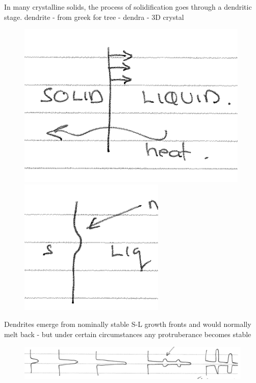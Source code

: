 \documentclass[class=report, crop=false, 12pt,a4paper]{standalone}
\begin{document}
In many crystalline solids, the process of solidification goes through a dendritic stage. dendrite - from greek for tree - dendra - 3D crystal
\begin{figure}[h!]
  \begin{minipage}[b]{0.45\textwidth}
    \centering
    \includegraphics[width = 0.75\linewidth]{../img/dendriticgrowth4}
  \end{minipage}
  \hfill
  \begin{minipage}[b]{0.45\textwidth}
    \centering
    \includegraphics[width = 0.75\linewidth]{../img/dendriticgrowth3}
  \end{minipage} 
\end{figure}
Dendrites emerge from nominally stable S-L growth fronts and would normally melt back - but under certain circumstances any protruberance becomes stable
\begin{figure}
  \centering
  \includegraphics[width = \textwidth]{../img/dendriticgrowth2}
\end{figure}
\end{document}
